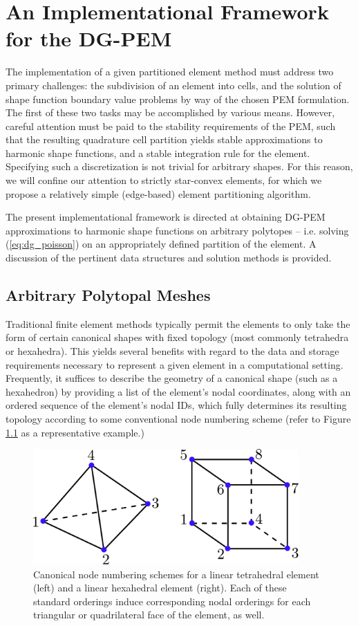 \chapter{An Implementational Framework \\ for the DG-PEM} \label{ch:implementation}
%
The implementation of a given partitioned element method must address two primary challenges: the subdivision of an element into cells, and the solution of shape function boundary value problems by way of the chosen PEM formulation. The first of these two tasks may be accomplished by various means. However, careful attention must be paid to the stability requirements of the PEM, such that the resulting quadrature cell partition yields stable approximations to harmonic shape functions, and a stable integration rule for the element. Specifying such a discretization is not trivial for arbitrary shapes. For this reason, we will confine our attention to strictly star-convex elements, for which we propose a relatively simple (edge-based) element partitioning algorithm.

The present implementational framework is directed at obtaining DG-PEM approximations to harmonic shape functions on arbitrary polytopes -- i.e. solving (\ref{eq:dg_poisson}) on an appropriately defined partition of the element. A discussion of the pertinent data structures and solution methods is provided.

\section{Arbitrary Polytopal Meshes}

	Traditional finite element methods typically permit the elements to only take the form of certain canonical shapes with fixed topology (most commonly tetrahedra or hexahedra). This yields several benefits with regard to the data and storage requirements necessary to represent a given element in a computational setting. Frequently, it suffices to describe the geometry of a canonical shape (such as a hexahedron) by providing a list of the element's nodal coordinates, along with an ordered sequence of the element's nodal IDs, which fully determines its resulting topology according to some conventional node numbering scheme (refer to Figure \ref{fig:canonical_orderings} as a representative example.)
	\begin{figure} [!ht]
		\centering
		\includegraphics[width = 4.0in]{figures/canonical_orderings.pdf}
		\caption{Canonical node numbering schemes for a linear tetrahedral element (left) and a linear hexahedral element (right). Each of these standard orderings induce corresponding nodal orderings for each triangular or quadrilateral face of the element, as well.}
		\label{fig:canonical_orderings}
	\end{figure}
	
